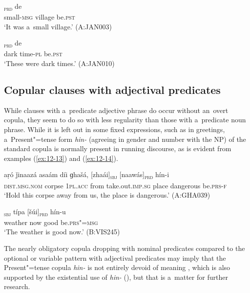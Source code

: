 \begin{exe}
\ex
\label{ex:12-11}
\textsubscript{\textsc{prd}} de \\
small-\textsc{msg} village be.\textsc{pst} \\
\glt `It was a~small village.' (A:JAN003)
\end{exe}
\begin{exe}
\ex
\label{ex:12-12}
\textsubscript{\textsc{prd}} de \\
dark time-\textsc{pl} be.\textsc{pst} \\
\glt `These were dark times.' (A:JAN010)
\end{exe}

\subsection{Copular clauses with adjectival predicates}
\label{subsec:12-1-2}


While clauses with a~predicate adjective phrase do occur without an~overt copula, they seem to do so with less regularity than those with a~predicate noun phrase. While it is left out in some fixed expressions, such as in greetings, a~Present"=tense form \textit{hin-} (agreeing in gender and number with the NP) of the standard copula is normally present in running discourse, as is evident from examples (\ref{ex:12-13}) and (\ref{ex:12-14}). 

\begin{exe}
\ex
\label{ex:12-13}
\gll aṛó ǰinaazá asaám díi ɡhašá, [zhaái]\textsubscript{\textsc{sbj}} [naawás]\textsubscript{\textsc{prd}} hín-i \\
\textsc{dist.msg.nom} corpse \textsc{1pl.acc} from take.out.\textsc{imp.sg}  place dangerous be.\textsc{prs-f} \\
\glt `Hold this corpse away from us, the place is dangerous.' (A:GHA039)
\end{exe}
\begin{exe}
\ex
\label{ex:12-14}
\gll [moosúm]\textsubscript{\textsc{sbj}} típa [šúi]\textsubscript{\textsc{prd}} hín-u \\
weather now good be.\textsc{prs"=msg} \\
\glt `The weather is good now.' (B:VIS245)
\end{exe}

The nearly obligatory copula dropping with nominal predicates compared to the optional or variable pattern with adjectival predicates may imply that the Present"=tense copula \textit{hin-} is not entirely devoid of meaning \citep[8, 31, 66]{pustet2003}, which is also supported by the existential use of \textit{hin-} (), but that is a~matter for further research.



